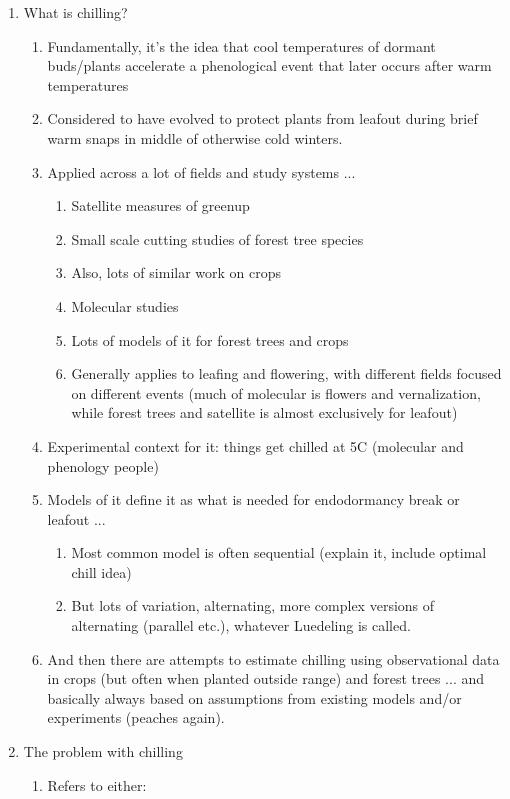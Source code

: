 \documentclass[11pt,letter]{article}
\begin{document}
\begin{enumerate}
\item What is chilling?
\begin{enumerate}
\item Fundamentally, it's the idea that cool temperatures of dormant buds/plants accelerate a phenological event that later occurs after warm temperatures
\item Considered to have evolved to protect plants from leafout during brief warm snaps in middle of otherwise cold winters. 
\item Applied across a lot of fields and study systems ...
\begin{enumerate}
\item Satellite measures of greenup
\item Small scale cutting studies of forest tree species
\item Also, lots of similar work on crops
\item Molecular studies
\item Lots of models of it for forest trees and crops
\item Generally applies to leafing and flowering, with different fields focused on different events (much of molecular is flowers and vernalization, while forest trees and satellite is almost exclusively for leafout)
\end{enumerate}
\item Experimental context for it: things get chilled at 5\degree C (molecular and phenology people)
\item Models of it define it as what is needed for endodormancy break or leafout ...
\begin{enumerate}
\item Most common model is often sequential (explain it, include optimal chill idea)
\item But lots of variation, alternating, more complex versions of alternating (parallel etc.), whatever Luedeling is called. 
\end{enumerate}
\item And then there are attempts to estimate chilling using observational data in crops (but often when planted outside range) and forest trees ... and basically always based on assumptions from existing models and/or experiments (peaches again). 
\end{enumerate}
\item The problem with chilling
\begin{enumerate}
\item Refers to either:
\begin{enumerate}

\end{enumerate}
\end{enumerate}
\end{enumerate}
\end{document}
